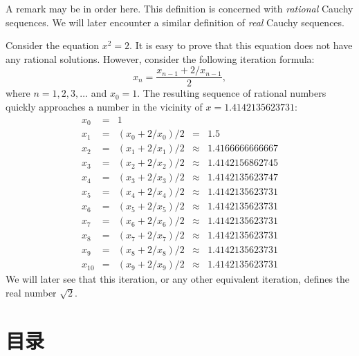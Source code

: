 \begin{remark}
  A remark may be in order here. This definition is concerned with
  \emph{rational} Cauchy sequences. We will later encounter a similar
  definition of \emph{real} Cauchy sequences.
\end{remark}

\begin{example}[Solving the equation $x^2 = 2$]
  Consider the equation $x^2 = 2$. It is easy to prove that this
  equation does not have any rational solutions. However, consider
  the following iteration formula:
  \begin{equation}
    x_n = \frac{x_{n-1} + 2 / x_{n - 1}}{2},
  \end{equation}
  where $n = 1,2,3,\ldots$ and $x_0 = 1$. The resulting sequence of
  rational numbers quickly approaches a number in the vicinity of
  $x = 1.4142135623731$:
  \begin{displaymath}
    \begin{array}{rclcl}
      x_0 &=& 1 \\
      x_{1} &=& (x_{0} + 2 / x_{0}) / 2 &=& 1.5 \\
      x_{2} &=& (x_{1} + 2 / x_{1}) / 2 &\approx& 1.4166666666667 \\
      x_{3} &=& (x_{2} + 2 / x_{2}) / 2 &\approx& 1.4142156862745 \\
      x_{4} &=& (x_{3} + 2 / x_{3}) / 2 &\approx& 1.4142135623747 \\
      x_{5} &=& (x_{4} + 2 / x_{4}) / 2 &\approx& 1.4142135623731 \\
      x_{6} &=& (x_{5} + 2 / x_{5}) / 2 &\approx& 1.4142135623731 \\
      x_{7} &=& (x_{6} + 2 / x_{6}) / 2 &\approx& 1.4142135623731 \\
      x_{8} &=& (x_{7} + 2 / x_{7}) / 2 &\approx& 1.4142135623731 \\
      x_{9} &=& (x_{8} + 2 / x_{8}) / 2 &\approx& 1.4142135623731 \\
      x_{10} &=& (x_{9} + 2 / x_{9}) / 2 &\approx& 1.4142135623731
    \end{array}
  \end{displaymath}
  We will later see that this iteration, or any other equivalent
  iteration, defines the real number $\sqrt{2}$.
\end{example}

\section{目录}


